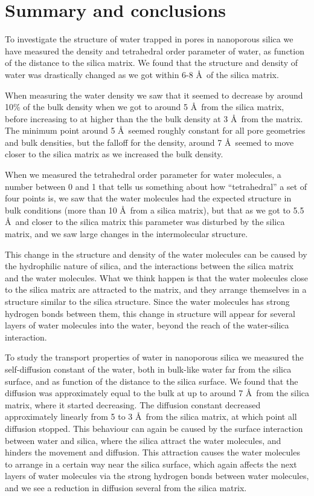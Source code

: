 \chapter{Summary and conclusions}
To investigate the structure of water trapped in pores in nanoporous silica we have measured the density and tetrahedral order parameter of water, as function of the distance to the silica matrix. We found that the structure and density of water was drastically changed as we got within 6-8 \AA\ of the silica matrix.

When measuring the water density we saw that it seemed to decrease by around 10\% of the bulk density when we got to around 5 \AA\ from the silica matrix, before increasing to at higher than the the bulk density at 3 \AA\ from the matrix. The minimum point around 5 \AA\ seemed roughly constant for all pore geometries and bulk densities, but the falloff for the density, around 7 \AA\ seemed to move closer to the silica matrix as we increased the bulk density.

When we measured the tetrahedral order parameter for water molecules, a number between 0 and 1 that tells us something about how ``tetrahedral'' a set of four points is, we saw that the water molecules had the expected structure in bulk conditions (more than 10 \AA\ from a silica matrix), but that as we got to 5.5 \AA\ and closer to the silica matrix this parameter was disturbed by the silica matrix, and we saw large changes in the intermolecular structure.

This change in the structure and density of the water molecules can be caused by the hydrophilic nature of silica, and the interactions between the silica matrix and the water molecules. What we think happen is that the water molecules close to the silica matrix are attracted to the matrix, and they arrange themselves in a structure similar to the silica structure. Since the water molecules has strong hydrogen bonds between them, this change in structure will appear for several layers of water molecules into the water, beyond the reach of the water-silica interaction.

To study the transport properties of water in nanoporous silica we measured the self-diffusion constant of the water, both in bulk-like water far from the silica surface, and as function of the distance to the silica surface. We found that the diffusion was approximately equal to the bulk at up to around 7 \AA\ from the silica matrix, where it started decreasing. The diffusion constant decreased approximately linearly from 5 to 3 \AA\ from the silica matrix, at which point all diffusion stopped. This behaviour can again be caused by the surface interaction between water and silica, where the silica attract the water molecules, and hinders the movement and diffusion. This attraction causes the water molecules to arrange in a certain way near the silica surface, which again affects the next layers of water molecules via the strong hydrogen bonds between water molecules, and we see a reduction in diffusion several \Ang from the silica matrix.

